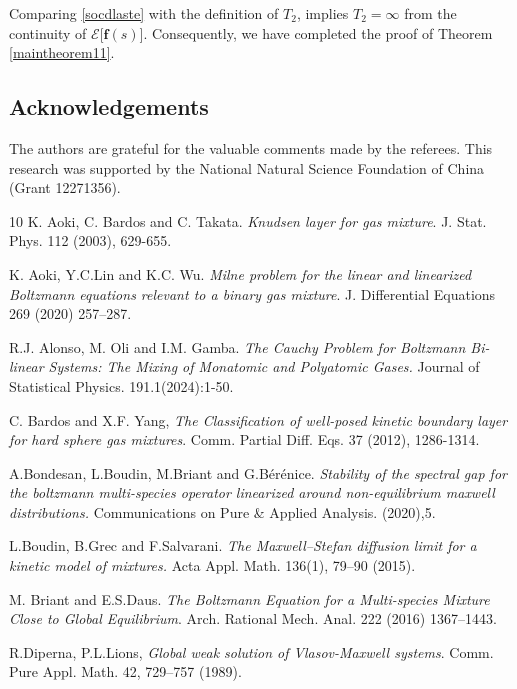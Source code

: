 \documentclass[reqno]{amsart}
\numberwithin{equation}{section}
\numberwithin{equation}{section}
\begin{document}
		Comparing \eqref{socdlaste} with the definition of $ T_2 $, implies $ T_2 = \infty $ from the continuity of $ \mathcal{E}\big[\mathbf{f}(s)\big] $. Consequently, we have completed the proof of Theorem \ref{maintheorem11}.
		
		
		
		
		
		
		
		
	\subsection*{Acknowledgements}
	The authors are grateful for the valuable comments made by the referees. This research was
	supported by the National Natural Science Foundation of China (Grant 12271356).
	
	\begin{thebibliography}{10}
		 K. Aoki, C. Bardos and C. Takata. \emph{Knudsen layer for gas mixture}.  J. Stat.
		Phys. 112 (2003), 629-655.   %
		
		 K. Aoki, Y.C.Lin and K.C. Wu. \emph{Milne problem for the linear and linearized Boltzmann
		equations relevant to a binary gas mixture}. J. Differential Equations 269 (2020) 257–287. %
		
		 R.J. Alonso, M. Oli and I.M. Gamba. \emph{The Cauchy Problem for Boltzmann Bi-linear Systems: The Mixing of Monatomic and Polyatomic Gases.} Journal of Statistical Physics. 191.1(2024):1-50. %
		
		 C. Bardos and X.F. Yang, \emph{The Classification of well-posed kinetic boundary layer for hard sphere gas mixtures}. Comm. Partial Diff. Eqs. 37 (2012), 1286-1314.    %
		
		 A.Bondesan, L.Boudin, M.Briant and  G.Bérénice. \emph{Stability of the spectral gap for the boltzmann multi-species operator linearized around non-equilibrium maxwell distributions.} Communications on Pure \& Applied Analysis. (2020),5. %

		 L.Boudin, B.Grec and F.Salvarani.  \emph{The Maxwell–Stefan diffusion limit for a kinetic
		model of mixtures.} Acta Appl. Math. 136(1), 79–90 (2015).
		
		
		 M. Briant and E.S.Daus. \emph{The Boltzmann Equation for a Multi-species
			Mixture Close to Global Equilibrium}. Arch. Rational Mech. Anal. 222 (2016) 1367–1443. %
		
		 R.Diperna, P.L.Lions, \emph{Global weak solution of Vlasov-Maxwell systems}. Comm.	Pure Appl. Math. 42, 729–757 (1989).  %
		

\end{thebibliography}
\end{document}
